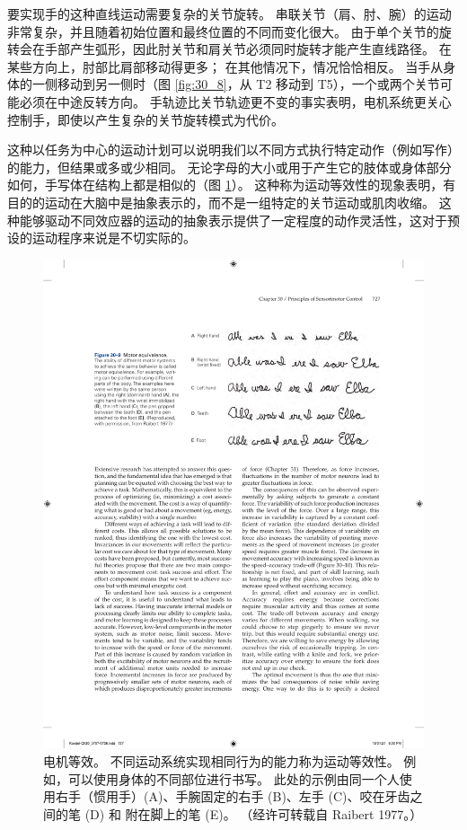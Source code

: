 要实现手的这种直线运动需要复杂的关节旋转。 串联关节（肩、肘、腕）的运动非常复杂，并且随着初始位置和最终位置的不同而变化很大。 由于单个关节的旋转会在手部产生弧形，因此肘关节和肩关节必须同时旋转才能产生直线路径。 在某些方向上，肘部比肩部移动得更多； 在其他情况下，情况恰恰相反。 当手从身体的一侧移动到另一侧时（图 \ref{fig:30_8}，从 T2 移动到 T5），一个或两个关节可能必须在中途反转方向。 手轨迹比关节轨迹更不变的事实表明，电机系统更关心控制手，即使以产生复杂的关节旋转模式为代价。

这种以任务为中心的运动计划可以说明我们以不同方式执行特定动作（例如写作）的能力，但结果或多或少相同。 
无论字母的大小或用于产生它的肢体或身体部分如何，手写体在结构上都是相似的（图 \ref{fig:30_9}）。 
这种称为运动等效性的现象表明，有目的的运动在大脑中是抽象表示的，而不是一组特定的关节运动或肌肉收缩。 这种能够驱动不同效应器的运动的抽象表示提供了一定程度的动作灵活性，这对于预设的运动程序来说是不切实际的。

\begin{figure}[htbp]
	\centering
	\includegraphics[width=0.7\linewidth]{chap30/fig_30_9}
	\caption{电机等效。 不同运动系统实现相同行为的能力称为运动等效性。 例如，可以使用身体的不同部位进行书写。 此处的示例由同一个人使用右手（惯用手）(A)、手腕固定的右手 (B)、左手 (C)、咬在牙齿之间的笔 (D) 和 附在脚上的笔 (E)。 （经许可转载自 Raibert 1977。）}
	\label{fig:30_9}
\end{figure}



